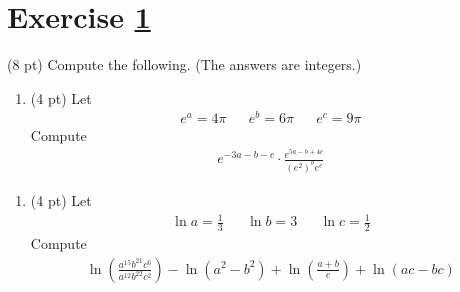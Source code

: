 %
%
%
%


\newpage

\section{Exercise \ref{sec : Math112 Spring2022 MockExam1 Q2}}
\label{sec : Math112 Spring2022 MockExam1 Q2}

(8 pt) Compute the following. (The answers are integers.)

\begin{enumerate}[label=(\alph*)]
\item\label{itm : ME1Q2a} (4 pt) Let
\begin{align*}
e^{a}
=
4 \pi
&&
e^{b}
=
6 \pi
&&
e^{c}
=
9 \pi
\end{align*}
Compute
\begin{align*}
e^{-3 a - b - c} \cdot \frac{e^{5 a - b + 4 c}}{\left(e^{2}\right)^{b} e^{c}}
\end{align*}
\end{enumerate}


\begin{enumerate}[resume,label=(\alph*)]
\item\label{itm : ME1Q2b} (4 pt) Let
\begin{align*}
\ln a
=
\frac{1}{3}
&&
\ln b
=
3
&&
\ln c
=
\frac{1}{2}
\end{align*}
Compute
\begin{align*}
\ln\left(\frac{a^{15} b^{21} c^{6}}{a^{12} b^{22} c^{2}}\right) - \ln\left(a^{2} - b^{2}\right) + \ln\left(\frac{a + b}{c}\right) + \ln(a c - b c)
\end{align*}
\end{enumerate}

